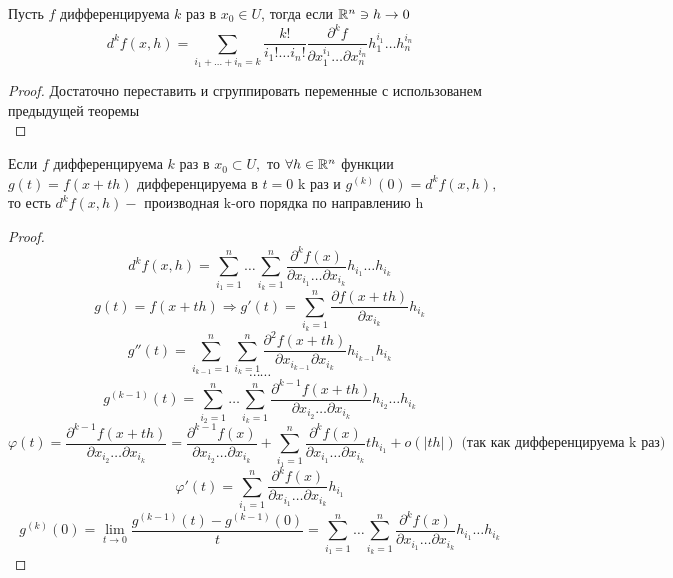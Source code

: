 \begin{theorem}
	Пусть $f$ дифференцируема $k$ раз в $x_0 \in U$, тогда если $\mathbb{R}^n \ni h \to 0$
	\[ d^kf(x, h) = \sum_{i_1 + \ldots + i_n = k} \frac{k!}{i_1! \ldots i_n!} \frac{\partial^k f}{\partial x_1^{i_1}\ldots \partial x_n^{i_n}} h_1^{i_1} \ldots h_n^{i_n} \]
	\begin{proof}
		Достаточно переставить и сгруппировать переменные с использованем предыдущей теоремы\\
	\end{proof}
\end{theorem}

\begin{lemma}
	Если $f$ дифференцируема $k$ раз в $x_0 \subset U,$ то $\forall h \in \mathbb{R}^n$ функции $g(t) = f(x + th)$ дифференцируема в $t = 0$ k раз и $g^{(k)}(0) = d^kf(x, h),$ то есть $d^kf(x, h) -$ производная k-ого порядка по направлению h\\
	\begin{proof}
		\[ d^kf(x, h) =  \sum^{n}_{i_1 = 1} \ldots \sum^{n}_{i_k = 1} \frac{\partial^kf(x)}{\partial x_{i_1} \ldots \partial x_{i_k}} h_{i_1} \ldots h_{i_k} \]
		\[ g(t) = f(x + th) \Rightarrow g'(t) = \sum_{i_k = 1}^{n} \frac{\partial f(x + th)}{\partial x_{i_k}} h_{i_k} \]
		\[ g''(t) =  \sum_{i_{k - 1} = 1}^{n} \sum_{i_k = 1}^{n} \frac{\partial^2 f(x + th)}{\partial x_{i_{k-1}} \partial x_{i_k}} h_{i_{k-1}} h_{i_k} \] 
		\[ \cdots \cdots \]
		\[ g^{(k-1)}(t) =  \sum^{n}_{i_2 = 1} \ldots \sum^{n}_{i_k = 1} \frac{\partial^{k-1}f(x + th)}{\partial x_{i_2} \ldots \partial x_{i_k}} h_{i_2} \ldots h_{i_k} \] 
		\[ \varphi(t) =  \frac{\partial^{k-1}f(x + th)}{\partial x_{i_2} \ldots \partial x_{i_k}} = \frac{\partial^{k-1}f(x)}{\partial x_{i_2} \ldots \partial x_{i_k}} + \sum^{n}_{i_1 = 1} \frac{\partial^{k}f(x)}{\partial x_{i_1} \ldots \partial x_{i_k}} t h_{i_1} + o(|th|) \text{ (так как дифференцируема k раз)} \] 
		\[ \varphi'(t) = \sum^{n}_{i_1 = 1} \frac{\partial^{k}f(x)}{\partial x_{i_1} \ldots \partial x_{i_k}} h_{i_1} \]
		\[ g^{(k)}(0) = \lim_{t\to0}\frac{g^{(k - 1)}(t) - g^{(k - 1)}(0)}{t} = \sum^{n}_{i_1 = 1} \ldots \sum^{n}_{i_k = 1} \frac{\partial^kf(x)}{\partial x_{i_1} \ldots \partial x_{i_k}} h_{i_1} \ldots h_{i_k} \]
	\end{proof}
\end{lemma}

